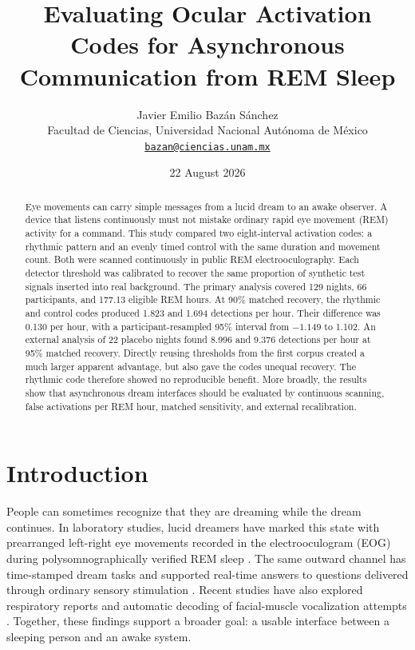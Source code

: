 \documentclass[10pt,twocolumn]{article}
\title{Evaluating Ocular Activation Codes for Asynchronous\\
Communication from REM Sleep}
\author{Javier Emilio Baz\'an S\'anchez\\
\small Facultad de Ciencias, Universidad Nacional Aut\'onoma de M\'exico\\
\small \href{mailto:bazan@ciencias.unam.mx}{\texttt{bazan@ciencias.unam.mx}}}
\date{22 August 2026}
\begin{document}
\maketitle

\begin{abstract}
Eye movements can carry simple messages from a lucid dream to an awake observer. A device that listens continuously must not mistake ordinary rapid eye movement (REM) activity for a command. This study compared two eight-interval activation codes: a rhythmic pattern and an evenly timed control with the same duration and movement count. Both were scanned continuously in public REM electrooculography. Each detector threshold was calibrated to recover the same proportion of synthetic test signals inserted into real background. The primary analysis covered 129 nights, 66 participants, and 177.13 eligible REM hours. At 90\% matched recovery, the rhythmic and control codes produced 1.823 and 1.694 detections per hour. Their difference was 0.130 per hour, with a participant-resampled 95\% interval from $-1.149$ to 1.102. An external analysis of 22 placebo nights found 8.996 and 9.376 detections per hour at 95\% matched recovery. Directly reusing thresholds from the first corpus created a much larger apparent advantage, but also gave the codes unequal recovery. The rhythmic code therefore showed no reproducible benefit. More broadly, the results show that asynchronous dream interfaces should be evaluated by continuous scanning, false activations per REM hour, matched sensitivity, and external recalibration.
\end{abstract}

\section{Introduction}

People can sometimes recognize that they are dreaming while the dream continues. In laboratory studies, lucid dreamers have marked this state with prearranged left-right eye movements recorded in the electrooculogram (EOG) during polysomnographically verified REM sleep \citep{laberge1981}. The same outward channel has time-stamped dream tasks \citep{laberge2018} and supported real-time answers to questions delivered through ordinary sensory stimulation \citep{konkoly2021,turker2023}. Recent studies have also explored respiratory reports \citep{konkoly2026} and automatic decoding of facial-muscle vocalization attempts \citep{raduga2025}. Together, these findings support a broader goal: a usable interface between a sleeping person and an awake system.
\end{document}
